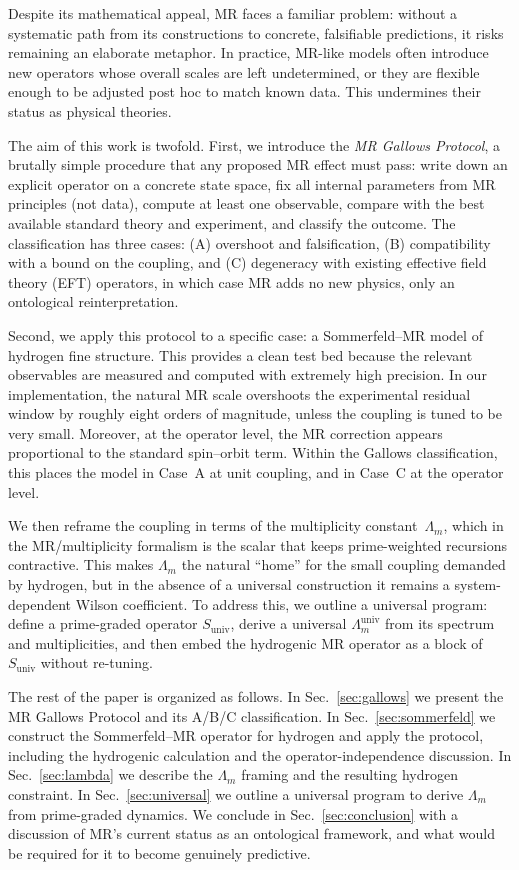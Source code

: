 \documentclass[11pt,a4paper]{article}
\begin{document}
Despite its mathematical appeal, MR faces a familiar problem: without a systematic path from its constructions to concrete, falsifiable predictions, it risks remaining an elaborate metaphor. In practice, MR-like models often introduce new operators whose overall scales are left undetermined, or they are flexible enough to be adjusted post hoc to match known data. This undermines their status as physical theories.

The aim of this work is twofold. First, we introduce the \emph{MR Gallows Protocol}, a brutally simple procedure that any proposed MR effect must pass: write down an explicit operator on a concrete state space, fix all internal parameters from MR principles (not data), compute at least one observable, compare with the best available standard theory and experiment, and classify the outcome. The classification has three cases: (A) overshoot and falsification, (B) compatibility with a bound on the coupling, and (C) degeneracy with existing effective field theory (EFT) operators, in which case MR adds no new physics, only an ontological reinterpretation.

Second, we apply this protocol to a specific case: a Sommerfeld--MR model of hydrogen fine structure. This provides a clean test bed because the relevant observables are measured and computed with extremely high precision. In our implementation, the natural MR scale overshoots the experimental residual window by roughly eight orders of magnitude, unless the coupling is tuned to be very small. Moreover, at the operator level, the MR correction appears proportional to the standard spin--orbit term. Within the Gallows classification, this places the model in Case~A at unit coupling, and in Case~C at the operator level.

We then reframe the coupling in terms of the multiplicity constant~$\Lambda_m$, which in the MR/multiplicity formalism is the scalar that keeps prime-weighted recursions contractive. This makes $\Lambda_m$ the natural ``home'' for the small coupling demanded by hydrogen, but in the absence of a universal construction it remains a system-dependent Wilson coefficient. To address this, we outline a universal program: define a prime-graded operator $S_{\text{univ}}$, derive a universal $\Lambda_m^{\text{univ}}$ from its spectrum and multiplicities, and then embed the hydrogenic MR operator as a block of $S_{\text{univ}}$ without re-tuning.

The rest of the paper is organized as follows. In Sec.~\ref{sec:gallows} we present the MR Gallows Protocol and its A/B/C classification. In Sec.~\ref{sec:sommerfeld} we construct the Sommerfeld--MR operator for hydrogen and apply the protocol, including the hydrogenic calculation and the operator-independence discussion. In Sec.~\ref{sec:lambda} we describe the $\Lambda_m$ framing and the resulting hydrogen constraint. In Sec.~\ref{sec:universal} we outline a universal program to derive $\Lambda_m$ from prime-graded dynamics. We conclude in Sec.~\ref{sec:conclusion} with a discussion of MR's current status as an ontological framework, and what would be required for it to become genuinely predictive.
\end{document}

